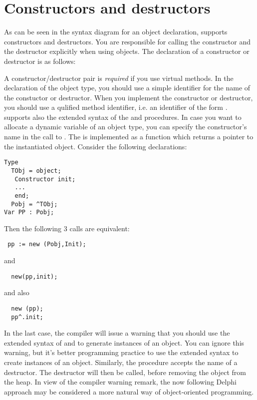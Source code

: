 \documentclass{report}
\begin{document}
\section{Constructors and destructors }
\label{se:constructdestruct}
As can be seen in the syntax diagram for an object declaration, \fpc supports
constructors and destructors. You are responsible for calling the
constructor and the destructor explicitly when using objects.
The declaration of a constructor or destructor is as follows:

A constructor/destructor pair is {\em required} if you use virtual methods.
In the declaration of the object type, you should use a simple identifier
for the name of the constuctor or destructor. When you implement the
constructor or destructor, you should use a qulified method identifier,
i.e. an identifier of the form .
\fpc supports also the extended syntax of the  and 
procedures. In case you want to allocate a dynamic variable of an object
type, you can specify the constructor's name in the call to .
The  is implemented as a function which returns a pointer to the
instantiated object. Consider the following declarations:
\begin{verbatim}
Type
  TObj = object;
   Constructor init;
   ...
   end;
  Pobj = ^TObj;
Var PP : Pobj;
\end{verbatim}
Then the following 3 calls are equivalent:
\begin{verbatim}
 pp := new (Pobj,Init);
\end{verbatim}
and
\begin{verbatim}
  new(pp,init);
\end{verbatim}
and also
\begin{verbatim}
  new (pp);
  pp^.init;
\end{verbatim}
In the last case, the compiler will issue a warning that you should use the
extended syntax of  and  to generate instances of an
object. You can ignore this warning, but it's better programming practice to
use the extended syntax to create instances of an object.
Similarly, the  procedure accepts the name of a destructor. The
destructor will then be called, before removing the object from the heap.
In view of the compiler warning remark, the now following Delphi approach may
be considered a more natural way of object-oriented programming.
\end{document}
